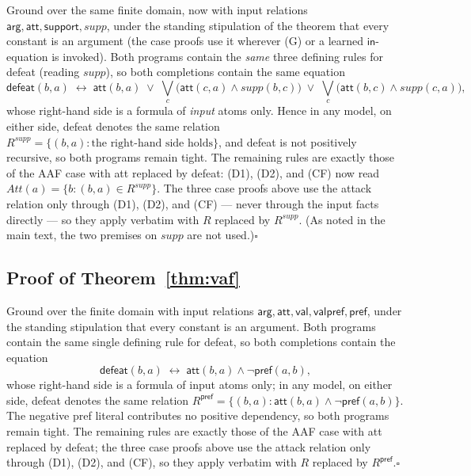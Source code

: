 \documentclass[review,12pt]{elsarticle}
\theoremstyle{definition}
\theoremstyle{remark}
\newcommand{\pred}[1]{\textsf{#1}}
\newcommand{\Att}{\mathit{Att}}
\begin{document}
Ground over the same finite domain, now with input relations
$\pred{arg},\pred{att},\pred{support},\mathit{supp}$, under the standing
stipulation of the theorem that every constant is an argument (the case
proofs use it wherever (G) or a learned $\pred{in}$-equation is invoked).
Both programs contain
the \emph{same} three defining rules for \pred{defeat} (reading
$\mathit{supp}$), so both completions contain the same equation
\[
\pred{defeat}(b,a)\;\leftrightarrow\;
\pred{att}(b,a)\;\vee\;
\textstyle\bigvee_{c}\bigl(\pred{att}(c,a)\wedge\mathit{supp}(b,c)\bigr)
\;\vee\;
\textstyle\bigvee_{c}\bigl(\pred{att}(b,c)\wedge\mathit{supp}(c,a)\bigr),
\]
whose right-hand side is a formula of \emph{input} atoms only. Hence in any
model, on either side, \pred{defeat} denotes the same relation
$R^{\mathit{supp}}=\{(b,a): \text{the right-hand side holds}\}$, and
\pred{defeat} is not positively recursive, so both programs remain tight.
The remaining rules are exactly those of the AAF case with \pred{att}
replaced by \pred{defeat}: (D1), (D2), and (CF) now read
$\Att(a)=\{b:(b,a)\in R^{\mathit{supp}}\}$. The three case proofs above use
the attack relation only through (D1), (D2), and (CF) --- never through the
input facts directly --- so they apply verbatim with $R$ replaced by
$R^{\mathit{supp}}$. (As noted in the main text, the two premises on
$\mathit{supp}$ are not used.)\hfill$\square$

\subsection{Proof of Theorem~\ref{thm:vaf}}

Ground over the finite domain with input relations
$\pred{arg},\pred{att},\pred{val},\pred{valpref},\pred{pref}$, under the
standing stipulation that every constant is an argument. Both programs
contain the same single defining rule for \pred{defeat}, so both completions
contain the equation
\[
\pred{defeat}(b,a)\;\leftrightarrow\;
\pred{att}(b,a)\wedge\neg\pred{pref}(a,b),
\]
whose right-hand side is a formula of input atoms only; in any model, on
either side, \pred{defeat} denotes the same relation
$R^{\pred{pref}}=\{(b,a):\pred{att}(b,a)\wedge\neg\pred{pref}(a,b)\}$. The
negative \pred{pref} literal contributes no positive dependency, so both
programs remain tight. The remaining rules are exactly those of the AAF case
with \pred{att} replaced by \pred{defeat}; the three case proofs above use
the attack relation only through (D1), (D2), and (CF), so they apply verbatim
with $R$ replaced by $R^{\pred{pref}}$.\hfill$\square$
\end{document}
